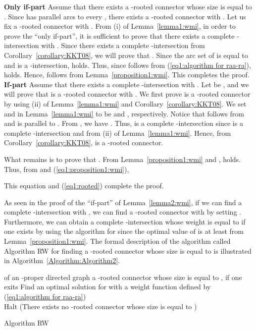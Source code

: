\documentclass[11pt]{article}
\theoremstyle{plain}
\newcommand{\eop}{\hfill \usebox{\ProofSym}}
\newenvironment{proof2}[1]{\noindent {\it Proof of #1.}}{\eop\par\vspace{0.3cm}}
\begin{document}
\begin{proof2}{Lemma~\ref{lemma2:wmi}}
{\bf Only if-part}
Assume that there exists a -rooted connector whose size is equal to .
Since  has  parallel arcs to every , there exists 
a -rooted connector  with . 
Let us fix a -rooted connector  with . 
From (i) of Lemma~\ref{lemma1:wmi}, in order to prove the ``only if-part'', it is sufficient to prove that there exists 
a complete -intersection  with . 
Since there exists a complete -intersection  from Corollary~\ref{corollary:KKT08}, 
we will prove that . 
Since the arc set of  is equal to  and 
 is a -intersection,  holds. 
Thus, since  follows from (\ref{eq1:algorithm for raa-ra}), 
 holds. 
Hence,  follows from Lemma~\ref{proposition1:wmi}. This completes the proof. 
\\
{\bf If-part}
Assume that there exists a complete -intersection 
 with . 
Let  be , and we will 
prove that  is a -rooted connector with 
. 
We first prove  is a -rooted connector by using (ii) of 
Lemma~\ref{lemma1:wmi} and Corollary~\ref{corollary:KKT08}. 
We set  and  in Lemma~\ref{lemma1:wmi} to be 
 and , respectively.
Notice that  follows from 
and  is parallel to .
From , we have . 
Thus,  is a complete -intersection
since  is a complete -intersection and from (ii) 
of Lemma~\ref{lemma1:wmi}.  
Hence, from Corollary~\ref{corollary:KKT08}, 
 is a -rooted connector. 

What remains is to prove that . 
From Lemma~\ref{proposition1:wmi} and ,
 holds. 
Thus, from  and (\ref{eq1:proposition1:wmi}), 
 
This equation and (\ref{eq1:rooted}) complete the proof. 
\end{proof2}

As seen in the proof of the ``if-part'' of Lemma~\ref{lemma2:wmi}, 
if we can find a complete -intersection  
with , we can find 
a -rooted connector  with  
by setting . 
Furthermore, we can obtain a complete -intersection 
whose weight is equal to  if one exists by using the algorithm for 
since the optimal value of  is at least  
from Lemma~\ref{proposition1:wmi}. The formal description of the algorithm 
called Algorithm {\sf RW}
for finding a -rooted connector whose size is equal to 
is illustrated in Algorithm~\ref{Algorithm:Algorithm2}.

\begin{algorithm}[h]
\begin{algorithmic}[1]
\INPUT  of an -proper directed graph  
\OUTPUT a -rooted connector whose size is equal to , if one exits
\STATE Find an optimal solution  for  
with a weight function  defined by (\ref{eq1:algorithm for raa-ra})\\
\STATE Halt (There exists no -rooted connector whose size is equal to )
\ENDIF 
\RETURN 
\end{algorithmic}
\caption{Algorithm {\sf RW}}
\label{Algorithm:Algorithm2}
\end{algorithm}
\end{document}
